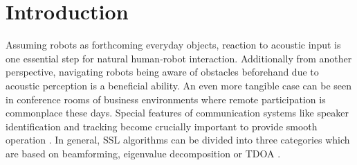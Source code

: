 \chapter{Introduction}
\label{chap:01_introduction}



Assuming robots as forthcoming everyday objects, reaction to acoustic
input is one essential step for natural human-robot interaction.
Additionally from another perspective, navigating robots being aware of obstacles beforehand
due to acoustic perception is a beneficial ability.
An even more tangible case can be seen in conference rooms of business environments
where remote participation is commonplace these days.
Special features of communication systems like speaker identification and tracking
become crucially important to provide smooth operation \cite{Brandstein96apractical}.
In general, \ac{SSL} algorithms can be divided into three categories
which are based on beamforming, eigenvalue
decomposition or \ac{TDOA} \cite{Brandstein96apractical,gcc_time_broeck,benesty_passive_acoustic}.

